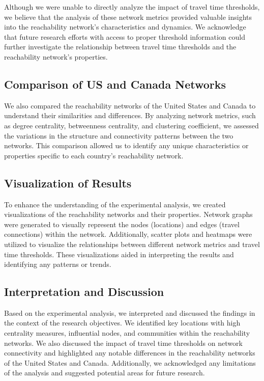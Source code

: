 Although we were unable to directly analyze the impact of travel time thresholds, we believe that the analysis of these network metrics provided valuable insights into the reachability network's characteristics and dynamics. We acknowledge that future research efforts with access to proper threshold information could further investigate the relationship between travel time thresholds and the reachability network's properties.

\subsection{Comparison of US and Canada Networks}

We also compared the reachability networks of the United States and Canada to understand their similarities and differences. By analyzing network metrics, such as degree centrality, betweenness centrality, and clustering coefficient, we assessed the variations in the structure and connectivity patterns between the two networks. This comparison allowed us to identify any unique characteristics or properties specific to each country's reachability network.

\subsection{Visualization of Results}

To enhance the understanding of the experimental analysis, we created visualizations of the reachability networks and their properties. Network graphs were generated to visually represent the nodes (locations) and edges (travel connections) within the network. Additionally, scatter plots and heatmaps were utilized to visualize the relationships between different network metrics and travel time thresholds. These visualizations aided in interpreting the results and identifying any patterns or trends.


\subsection{Interpretation and Discussion}

Based on the experimental analysis, we interpreted and discussed the findings in the context of the research objectives. We identified key locations with high centrality measures, influential nodes, and communities within the reachability networks. We also discussed the impact of travel time thresholds on network connectivity and highlighted any notable differences in the reachability networks of the United States and Canada. Additionally, we acknowledged any limitations of the analysis and suggested potential areas for future research.